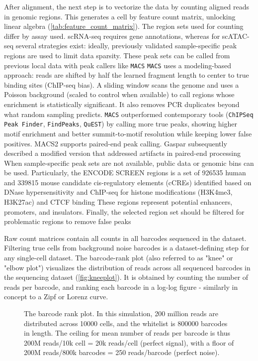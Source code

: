 After alignment, the next step is to vectorize the data by counting aligned reads in genomic regions. This generates a cell by feature count matrix, unlocking linear algebra (\autoref{tab:feature_count_matrix}). The region sets used for counting differ by assay used. scRNA-seq requires gene annotations, whereas for scATAC-seq several strategies exist: ideally, previously validated sample-specific peak regions are used to limit data sparsity. These peak sets can be called from previous local data with peak callers like \verb|MACS| \verb|MACS| uses a modeling-based approach: reads are shifted by half the learned fragment length to center to true binding sites (ChIP-seq bias). A sliding window scans the genome and uses a Poisson background (scaled to control when available) to call regions whose enrichment is statistically significant. It also removes PCR duplicates beyond what random sampling predicts. \verb|MACS| outperformed contemporary tools (\verb|ChIPSeq Peak Finder|, \verb|FindPeaks|, \verb|QuEST|) by calling more true peaks, showing higher motif enrichment and better summit-to-motif resolution while keeping lower false positives.  MACS2 supports paired-end peak calling. Gaspar subsequently described a modified version that addressed artifacts in paired-end processing When sample-specific peak sets are not available, public data or genomic bins can be used. Particularly, the ENCODE SCREEN regions is a set of \num{926535} human and \num{339815} mouse candidate cis-regulatory elements (cCREs) identified based on DNase hypersensitivity and ChIP-seq for histone modifications (H3K4me3, H3K27ac) and CTCF binding These regions represent potential enhancers, promoters, and insulators. Finally, the selected region set should be filtered for problematic regions to remove false peaks

Raw count matrices contain all counts in all barcodes sequenced in the dataset. Filtering true cells from background noise barcodes is a dataset-defining step for any single-cell dataset. The barcode-rank plot (also referred to as "knee" or "elbow plot") visualizes the distribution of reads across all sequenced barcodes in the sequencing dataset (\autoref{fig:kneeplot}). It is obtained by counting the number of reads per barcode, and ranking each barcode in a log-log figure - similarly in concept to a Zipf or Lorenz curve.

\begin{figure}[h]
	\centering
	\resizebox{1\textwidth}{!}{}
	\captionsetup{width=0.85\linewidth}
	\caption[Barcode rank simulation]{The barcode rank plot. In this simulation, 200 million reads are distributed across \num{10000} cells, and the whitelist is \num{800000} barcodes in length. The ceiling for mean number of reads per barcode is thus 200M reads/10k cell = 20k reads/cell (perfect signal), with a floor of 200M reads/800k barcodes = 250 reads/barcode (perfect noise).}
	\label{fig:kneeplot}
\end{figure}

